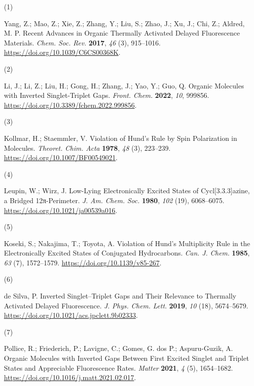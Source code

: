 \documentclass[
  number,
  3p]{elsarticle}
\newlength{\cslhangindent}
\newlength{\csllabelwidth}
\newlength{\cslentryspacingunit} %
\newenvironment{CSLReferences}[2] %
 {%
  \setlength{\parindent}{0pt}
  \ifodd #1
  \let\oldpar\par
  \def\par{\hangindent=\cslhangindent\oldpar}
  \fi
  \setlength{\parskip}{#2\cslentryspacingunit}
 }%
 {}
\newcommand{\CSLLeftMargin}[1]{\parbox[t]{\csllabelwidth}{#1}}
\newcommand{\CSLRightInline}[1]{\parbox[t]{\linewidth - \csllabelwidth}{#1}\break}
\begin{document}
\hypertarget{refs}{}
\begin{CSLReferences}{0}{0}
\leavevmode{}%
\CSLLeftMargin{(1) }%
\CSLRightInline{Yang, Z.; Mao, Z.; Xie, Z.; Zhang, Y.; Liu, S.; Zhao,
J.; Xu, J.; Chi, Z.; Aldred, M. P. Recent Advances in Organic Thermally
Activated Delayed Fluorescence Materials. \emph{Chem. Soc. Rev.}
\textbf{2017}, \emph{46} (3), 915--1016.
\url{https://doi.org/10.1039/C6CS00368K}.}

\leavevmode{}%
\CSLLeftMargin{(2) }%
\CSLRightInline{Li, J.; Li, Z.; Liu, H.; Gong, H.; Zhang, J.; Yao, Y.;
Guo, Q. Organic Molecules with Inverted Singlet-Triplet Gaps.
\emph{Front. Chem.} \textbf{2022}, \emph{10}, 999856.
\url{https://doi.org/10.3389/fchem.2022.999856}.}

\leavevmode{}%
\CSLLeftMargin{(3) }%
\CSLRightInline{Kollmar, H.; Staemmler, V. Violation of {Hund}'s Rule by
Spin Polarization in Molecules. \emph{Theoret. Chim. Acta}
\textbf{1978}, \emph{48} (3), 223--239.
\url{https://doi.org/10.1007/BF00549021}.}

\leavevmode{}%
\CSLLeftMargin{(4) }%
\CSLRightInline{Leupin, W.; Wirz, J. Low-Lying Electronically Excited
States of Cycl{[}3.3.3{]}azine, a Bridged 12π-Perimeter. \emph{J. Am.
Chem. Soc.} \textbf{1980}, \emph{102} (19), 6068--6075.
\url{https://doi.org/10.1021/ja00539a016}.}

\leavevmode{}%
\CSLLeftMargin{(5) }%
\CSLRightInline{Koseki, S.; Nakajima, T.; Toyota, A. Violation of
{Hund}'s Multiplicity Rule in the Electronically Excited States of
Conjugated Hydrocarbons. \emph{Can. J. Chem.} \textbf{1985}, \emph{63}
(7), 1572--1579. \url{https://doi.org/10.1139/v85-267}.}

\leavevmode{}%
\CSLLeftMargin{(6) }%
\CSLRightInline{de Silva, P. Inverted {Singlet}--{Triplet Gaps} and
{Their Relevance} to {Thermally Activated Delayed Fluorescence}.
\emph{J. Phys. Chem. Lett.} \textbf{2019}, \emph{10} (18), 5674--5679.
\url{https://doi.org/10.1021/acs.jpclett.9b02333}.}

\leavevmode{}%
\CSLLeftMargin{(7) }%
\CSLRightInline{Pollice, R.; Friederich, P.; Lavigne, C.; Gomes, G. dos
P.; Aspuru-Guzik, A. Organic Molecules with Inverted Gaps Between First
Excited Singlet and Triplet States and Appreciable Fluorescence Rates.
\emph{Matter} \textbf{2021}, \emph{4} (5), 1654--1682.
\url{https://doi.org/10.1016/j.matt.2021.02.017}.}


\end{CSLReferences}
\end{document}

